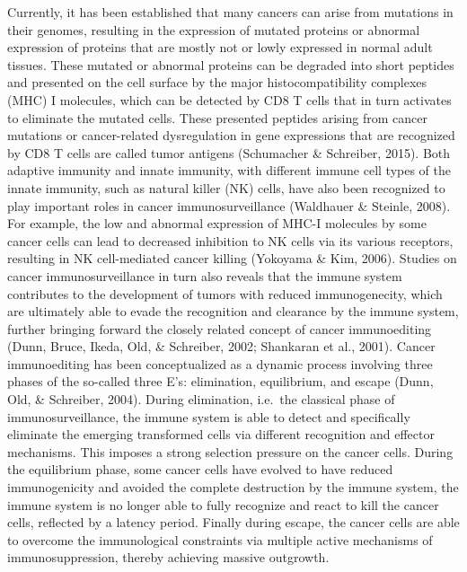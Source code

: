 \documentclass[12pt,twoside,openany,\mydriver]{thesis}  %
\begin{document}
Currently, it has been established that many cancers can arise from mutations in their genomes, resulting in the expression of mutated proteins or abnormal expression of proteins that are mostly not or lowly expressed in normal adult tissues. These mutated or abnormal proteins can be degraded into short peptides and presented on the cell surface by the major histocompatibility complexes (MHC) I molecules, which can be detected by CD8 T cells that in turn activates to eliminate the mutated cells. These presented peptides arising from cancer mutations or cancer-related dysregulation in gene expressions that are recognized by CD8 T cells are called tumor antigens (Schumacher \& Schreiber, 2015). Both adaptive immunity and innate immunity, with different immune cell types of the innate immunity, such as natural killer (NK) cells, have also been recognized to play important roles in cancer immunosurveillance (Waldhauer \& Steinle, 2008). For example, the low and abnormal expression of MHC-I molecules by some cancer cells can lead to decreased inhibition to NK cells via its various receptors, resulting in NK cell-mediated cancer killing (Yokoyama \& Kim, 2006). Studies on cancer immunosurveillance in turn also reveals that the immune system contributes to the development of tumors with reduced immunogenecity, which are ultimately able to evade the recognition and clearance by the immune system, further bringing forward the closely related concept of cancer immunoediting (Dunn, Bruce, Ikeda, Old, \& Schreiber, 2002; Shankaran et al., 2001). Cancer immunoediting has been conceptualized as a dynamic process involving three phases of the so-called three E's: elimination, equilibrium, and escape (Dunn, Old, \& Schreiber, 2004). During elimination, i.e.~the classical phase of immunosurveillance, the immune system is able to detect and specifically eliminate the emerging transformed cells via different recognition and effector mechanisms. This imposes a strong selection pressure on the cancer cells. During the equilibrium phase, some cancer cells have evolved to have reduced immunogenicity and avoided the complete destruction by the immune system, the immune system is no longer able to fully recognize and react to kill the cancer cells, reflected by a latency period. Finally during escape, the cancer cells are able to overcome the immunological constraints via multiple active mechanisms of immunosuppression, thereby achieving massive outgrowth.
\end{document}
